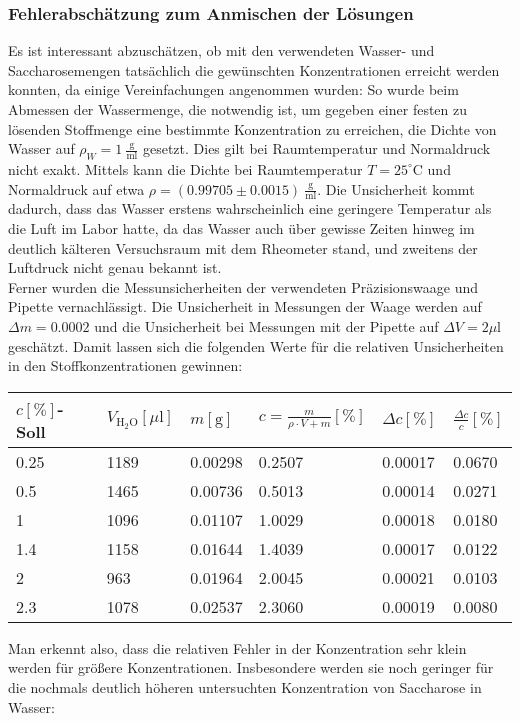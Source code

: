 \documentclass[11pt,a4paper,oneside]{scrartcl}
\begin{document}
\subsubsection{Fehlerabschätzung zum Anmischen der Lösungen}
Es ist interessant abzuschätzen, ob mit den verwendeten Wasser- und Saccharosemengen tatsächlich die gewünschten Konzentrationen erreicht werden konnten, da einige Vereinfachungen angenommen wurden:
So wurde beim Abmessen der Wassermenge, die notwendig ist, um gegeben einer festen zu lösenden Stoffmenge eine bestimmte Konzentration zu erreichen, die Dichte von Wasser auf $\rho_W=1\ \mathrm{\frac{g}{ml}}$ gesetzt. Dies gilt bei Raumtemperatur und Normaldruck nicht exakt. 
Mittels \cite{nist_water} kann die Dichte bei Raumtemperatur $T=25^\circ\mathrm C$ und Normaldruck auf etwa $\rho=(0.99705\pm0.0015)\ \mathrm{\frac{g}{ml}}$. Die Unsicherheit kommt dadurch, dass das Wasser erstens wahrscheinlich eine geringere Temperatur als die Luft im Labor hatte, da das Wasser auch über gewisse Zeiten hinweg im deutlich kälteren Versuchsraum mit dem Rheometer stand, und zweitens der Luftdruck nicht genau bekannt ist. \\
Ferner wurden die Messunsicherheiten der verwendeten Präzisionswaage und Pipette vernachlässigt. Die Unsicherheit in Messungen der Waage werden auf $\Delta m=0.0002$ und die Unsicherheit bei Messungen mit der Pipette auf $\Delta V=2\mu\mathrm l$ geschätzt. Damit lassen sich die folgenden Werte für die relativen Unsicherheiten in den Stoffkonzentrationen gewinnen:
\begin{table}[!ht]
    \centering
    \begin{tabular}{llllll}
    \hline
        $c [\%]$-Soll & $V_{\mathrm{H_2O}} [\mu \mathrm l]$ & $m [\mathrm g]$ & $c=\frac{m}{\rho\cdot V+m}[\%]$ & $\Delta c[\%]$ & $\frac{\Delta c}{c}[\%]$ \\ \hline
        0.25 & 1189 & 0.00298 & 0.2507 & 0.00017 & 0.0670 \\
        0.5 & 1465 & 0.00736 & 0.5013 & 0.00014 & 0.0271 \\ 
        1 & 1096 & 0.01107 & 1.0029 & 0.00018 & 0.0180 \\
        1.4 & 1158 & 0.01644 & 1.4039 & 0.00017 & 0.0122 \\ 
        2 & 963 & 0.01964 & 2.0045 & 0.00021 & 0.0103 \\
        2.3 & 1078 & 0.02537 & 2.3060 & 0.00019 & 0.0080 \\ \hline
    \end{tabular}
\end{table}
Man erkennt also, dass die relativen Fehler in der Konzentration sehr klein werden für größere Konzentrationen. Insbesondere werden sie noch geringer für die  nochmals deutlich höheren untersuchten Konzentration von Saccharose in Wasser:
\end{document}
